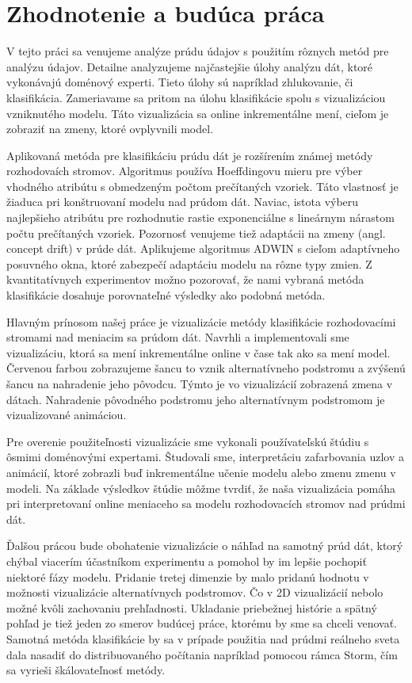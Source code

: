 \chapter{Zhodnotenie a budúca práca}
\label{Zhodnotenie a budúca práca}

V tejto práci sa venujeme analýze prúdu údajov s použitím rôznych metód pre analýzu údajov. Detailne analyzujeme najčastejšie úlohy analýzu dát, ktoré vykonávajú doménový experti. Tieto úlohy sú napríklad zhlukovanie, či klasifikácia. Zameriavame sa pritom na úlohu klasifikácie spolu s vizualizáciou vzniknutého modelu. Táto vizualizácia sa online inkrementálne mení, cieľom je zobraziť na zmeny, ktoré ovplyvnili model.
\par
Aplikovaná metóda pre klasifikáciu prúdu dát je rozšírením známej metódy rozhodovaích stromov. Algoritmus používa Hoeffdingovu mieru pre výber vhodného atribútu s obmedzeným počtom prečítaných vzoriek. Táto vlastnosť je žiaduca pri konštruovaní modelu nad prúdom dát. Naviac, istota výberu najlepšieho atribútu pre rozhodnutie rastie exponenciálne s lineárnym nárastom počtu prečítaných vzoriek. Pozornosť venujeme tiež adaptácii na zmeny (angl. concept drift) v prúde dát. Aplikujeme algoritmus ADWIN s cieľom adaptívneho posuvného okna, ktoré zabezpečí adaptáciu modelu na rôzne typy zmien. Z kvantitatívnych experimentov možno pozorovať, že nami vybraná metóda klasifikácie dosahuje porovnateľné výsledky ako podobná metóda.
\par
Hlavným prínosom našej práce je vizualizácie metódy klasifikácie rozhodovacími stromami nad meniacim sa prúdom dát. Navrhli a implementovali sme vizualizáciu, ktorá sa mení inkrementálne online v čase tak ako sa mení model. Červenou farbou zobrazujeme šancu to vznik alternatívneho podstromu a zvýšenú šancu na nahradenie jeho pôvodcu. Týmto je vo vizualizácií zobrazená zmena v dátach. Nahradenie pôvodného podstromu jeho alternatívnym podstromom je vizualizované animáciou.
\par
Pre overenie použiteľnosti vizualizácie sme vykonali používateľskú štúdiu s ôsmimi doménovými expertami. Študovali sme, interpretáciu zafarbovania uzlov a animácií, ktoré zobrazli buď inkrementálne učenie modelu alebo zmenu zmenu v modeli. Na základe výsledkov štúdie môžme tvrdiť, že naša vizualizácia pomáha pri interpretovaní online meniaceho sa modelu rozhodovacích stromov nad prúdmi dát.
\par
Ďalšou prácou bude obohatenie vizualizácie o náhľad na samotný prúd dát, ktorý chýbal viacerím účastníkom experimentu a pomohol by im lepšie pochopiť niektoré fázy modelu. Pridanie tretej dimenzie by malo pridanú hodnotu v možnosti vizualizácie alternatívnych podstromov. Čo v 2D vizualizácií nebolo možné kvôli zachovaniu prehľadnosti. Ukladanie priebežnej histórie a spätný pohľad je tiež jeden zo smerov budúcej práce, ktorému by sme sa chceli venovať. Samotná metóda klasifikácie by sa v prípade použitia nad prúdmi reálneho sveta dala nasadiť do distribuovaného počítania napríklad pomocou rámca Storm, čím sa vyrieši škálovateľnosť metódy.